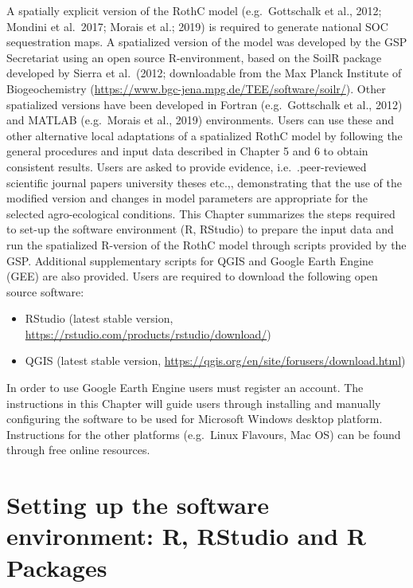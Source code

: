 \documentclass[
  10pt,
  b5paper,
]{book}
\providecommand{\tightlist}{%
  \setlength{\itemsep}{0pt}\setlength{\parskip}{0pt}}
\begin{document}
A spatially explicit version of the RothC model (e.g.~Gottschalk et al., 2012; Mondini et al.~2017; Morais et al.; 2019) is required to generate national SOC sequestration maps. A spatialized version of the model was developed by the GSP Secretariat using an open source R-environment, based on the SoilR package developed by Sierra et al.~(2012; downloadable from the Max Planck Institute of Biogeochemistry (\url{https://www.bgc-jena.mpg.de/TEE/software/soilr/}).
Other spatialized versions have been developed in Fortran (e.g.~Gottschalk et al., 2012) and MATLAB (e.g.~Morais et al., 2019) environments. Users can use these and other alternative local adaptations of a spatialized RothC model by following the general procedures and input data described in Chapter 5 and 6 to obtain consistent results. Users are asked to provide evidence, i.e.~.peer-reviewed scientific journal papers university theses etc.,, demonstrating that the use of the modified version and changes in model parameters are appropriate for the selected agro-ecological conditions.
This Chapter summarizes the steps required to set-up the software environment (R, RStudio) to prepare the input data and run the spatialized R-version of the RothC model through scripts provided by the GSP. Additional supplementary scripts for QGIS and Google Earth Engine (GEE) are also provided.
Users are required to download the following open source software:

\begin{itemize}
\tightlist
\item
  RStudio (latest stable version, \url{https://rstudio.com/products/rstudio/download/})
\item
  QGIS (latest stable version, \url{https://qgis.org/en/site/forusers/download.html})
\end{itemize}

In order to use Google Earth Engine users must register an account. The instructions in this Chapter will guide users through installing and manually configuring the software to be used for Microsoft Windows desktop platform. Instructions for the other platforms (e.g.~Linux Flavours, Mac OS) can be found through free online resources.

\hypertarget{setting-up-the-software-environment-r-rstudio-and-r-packages}{%
\section{Setting up the software environment: R, RStudio and R Packages}\label{setting-up-the-software-environment-r-rstudio-and-r-packages}}
\end{document}
